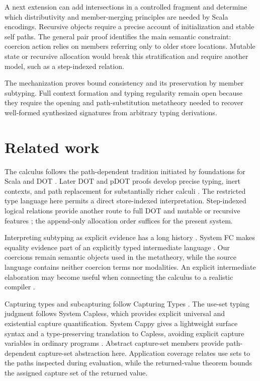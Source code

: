 \documentclass[acmsmall,screen,nonacm]{acmart}
\begin{document}
A next extension can add intersections in a controlled fragment and
determine which distributivity and member-merging principles are needed by
Scala encodings.  Recursive objects require a precise account of
initialization and stable self paths.  The general pair proof identifies the
main semantic constraint: coercion action relies on members referring only to
older store locations.  Mutable state or recursive allocation would break
this stratification and require another model, such as a step-indexed
relation.

The mechanization proves bound consistency and its preservation by member
subtyping.  Full context formation and typing regularity remain open because
they require the opening and path-substitution metatheory needed to recover
well-formed synthesized signatures from arbitrary typing derivations.

\section{Related work}

The calculus follows the path-dependent tradition initiated by foundations
for Scala and DOT \citep{amin2014foundations,rompf2016dot}.  Later DOT and
pDOT proofs develop precise typing, inert contexts, and path replacement for
substantially richer calculi
\citep{rapoport2017simple,rapoport2019pdot}.  The restricted type language
here permits a direct store-indexed interpretation.  Step-indexed logical
relations provide another route to full DOT and mutable or recursive
features \citep{giarrusso2020gdot}; the append-only allocation order suffices
for the present system.

Interpreting subtyping as explicit evidence has a long history
\citep{breazutannen1991coercion,crary2000inclusive}.  System FC makes equality
evidence part of an explicitly typed intermediate language
\citep{sulzmann2007systemfc}.  Our coercions remain semantic objects used in
the metatheory, while the source language contains neither coercion terms nor
modalities.  An explicit intermediate elaboration may become useful when
connecting the calculus to a realistic compiler
\citep{martres2023compilation}.

Capturing types and subcapturing follow Capturing Types
\citep{boruch2023capture}. The use-set typing judgment follows System Capless,
which provides explicit universal and existential capture quantification.
System Cappy gives a lightweight surface syntax and a type-preserving
translation to Capless, avoiding explicit capture variables in ordinary
programs \citep{xu2025box}. Abstract capture-set members
provide path-dependent capture-set abstraction here. Application coverage
relates use sets to the paths inspected during evaluation, while the
returned-value theorem bounds the assigned capture set of the returned value.
\end{document}
